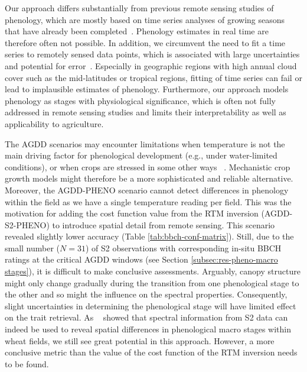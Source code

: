 Our approach differs substantially from previous remote sensing studies of phenology, which are mostly based on time series analyses of growing seasons that have already been completed~\citep{zeng_review_2020}. Phenology estimates in real time are therefore often not possible. In addition, we circumvent the need to fit a time series to remotely sensed data points, which is associated with large uncertainties and potential for error~\citep{younes_all_2021}. Especially in geographic regions with high annual cloud cover such as the mid-latitudes or tropical regions, fitting of time series can fail or lead to implausible estimates of phenology. Furthermore, our approach models phenology as stages with physiological significance, which is often not fully addressed in remote sensing studies and limits their interpretability as well as applicability to agriculture.

The AGDD scenarios may encounter limitations when temperature is not the main driving factor for phenological development (e.g., under water-limited conditions), or when crops are stressed in some other ways ~\citep{bonecke_decoupling_2020}. Mechanistic crop growth models might therefore be a more sophisticated and reliable alternative. Moreover, the AGDD-PHENO scenario cannot detect differences in phenology within the field as we have a single temperature reading per field. This was the motivation for adding the cost function value from the RTM inversion (AGDD-S2-PHENO) to introduce spatial detail from remote sensing. This scenario revealed slightly lower accuracy (Table \ref{tab:bbch-conf-matrix}). Still, due to the small number ($N=31$) of S2 observations with corresponding in-situ BBCH ratings at the critical AGDD windows (see Section \ref{subsec:res-pheno-macro stages}), it is difficult to make conclusive assessments. Arguably, canopy structure might only change gradually during the transition from one phenological stage to the other and so might the influence on the spectral properties. Consequently, slight uncertainties in determining the phenological stage will have limited effect on the trait retrieval. As ~\cite{liao_near_2023} showed that spectral information from S2 data can indeed be used to reveal spatial differences in phenological macro stages within wheat fields, we still see great potential in this approach. However, a more conclusive metric than the value of the cost function of the RTM inversion needs to be found.

